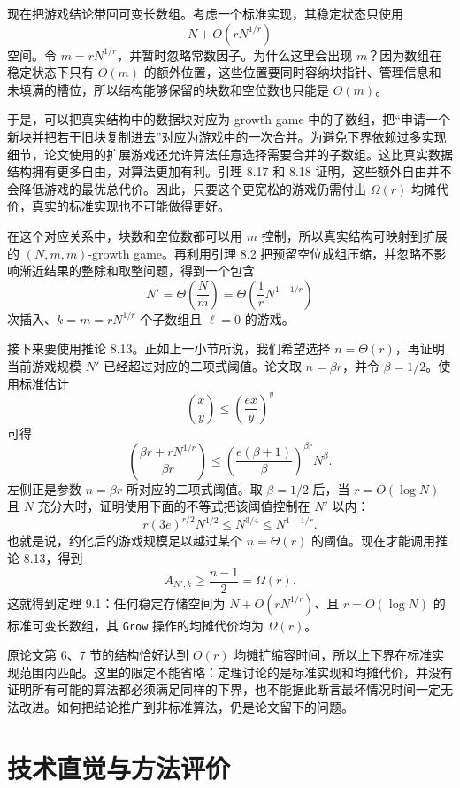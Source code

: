 \documentclass[12pt,a4paper]{article}
\begin{document}
现在把游戏结论带回可变长数组。考虑一个标准实现，其稳定状态只使用
\[
    N+O(rN^{1/r})
\]
空间。令 $m=rN^{1/r}$，并暂时忽略常数因子。为什么这里会出现 $m$？因为数组在稳定状态下只有 $O(m)$ 的额外位置，这些位置要同时容纳块指针、管理信息和未填满的槽位，所以结构能够保留的块数和空位数也只能是 $O(m)$。

于是，可以把真实结构中的数据块对应为 growth game 中的子数组，把“申请一个新块并把若干旧块复制进去”对应为游戏中的一次合并。为避免下界依赖过多实现细节，论文使用的扩展游戏还允许算法任意选择需要合并的子数组。这比真实数据结构拥有更多自由，对算法更加有利。引理 8.17 和 8.18 证明，这些额外自由并不会降低游戏的最优总代价。因此，只要这个更宽松的游戏仍需付出 $\Omega(r)$ 均摊代价，真实的标准实现也不可能做得更好。

在这个对应关系中，块数和空位数都可以用 $m$ 控制，所以真实结构可映射到扩展的 $(N,m,m)$-growth game。再利用引理 8.2 把预留空位成组压缩，并忽略不影响渐近结果的整除和取整问题，得到一个包含
\[
    N'=\Theta\!\left(\frac{N}{m}\right)
       =\Theta\!\left(\frac{1}{r}N^{1-1/r}\right)
\]
次插入、$k=m=rN^{1/r}$ 个子数组且 $\ell=0$ 的游戏。

接下来要使用推论 8.13。正如上一小节所说，我们希望选择 $n=\Theta(r)$，再证明当前游戏规模 $N'$ 已经超过对应的二项式阈值。论文取 $n=\beta r$，并令 $\beta=1/2$。使用标准估计
\[
    \binom{x}{y}\leq\left(\frac{ex}{y}\right)^y
\]
可得
\[
    \binom{\beta r+rN^{1/r}}{\beta r}
    \leq
    \left(\frac{e(\beta+1)}{\beta}\right)^{\beta r}N^\beta.
\]
左侧正是参数 $n=\beta r$ 所对应的二项式阈值。取 $\beta=1/2$ 后，当 $r=O(\log N)$ 且 $N$ 充分大时，证明使用下面的不等式把该阈值控制在 $N'$ 以内：
\[
    r(3e)^{r/2}N^{1/2}
    \leq N^{3/4}
    \leq N^{1-1/r}.
\]
也就是说，约化后的游戏规模足以越过某个 $n=\Theta(r)$ 的阈值。现在才能调用推论 8.13，得到
\[
    A_{N',k}\geq\frac{n-1}{2}=\Omega(r).
\]
这就得到定理 9.1：任何稳定存储空间为 $N+O(rN^{1/r})$、且 $r=O(\log N)$ 的标准可变长数组，其 \texttt{Grow} 操作的均摊代价均为 $\Omega(r)$\cite{tarjan2023optimalresizablearrays}。

原论文第 6、7 节的结构恰好达到 $O(r)$ 均摊扩缩容时间，所以上下界在标准实现范围内匹配。这里的限定不能省略：定理讨论的是标准实现和均摊代价，并没有证明所有可能的算法都必须满足同样的下界，也不能据此断言最坏情况时间一定无法改进。如何把结论推广到非标准算法，仍是论文留下的问题。


\section{技术直觉与方法评价}
\end{document}

